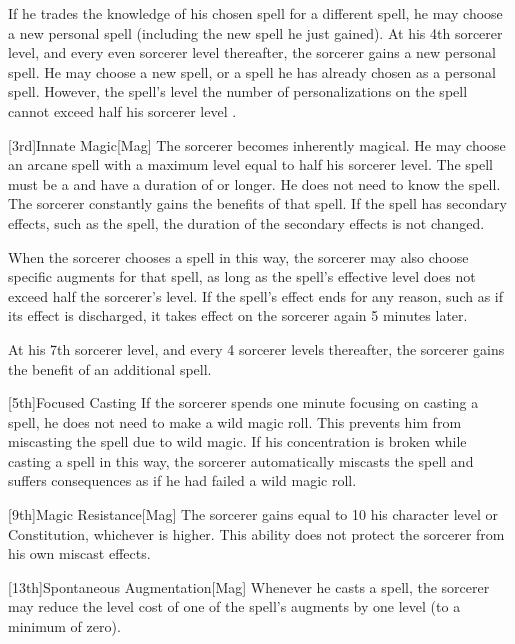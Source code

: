         If he trades the knowledge of his chosen spell for a different spell, he may choose a new personal spell (including the new spell he just gained).
        At his 4th sorcerer level, and every even sorcerer level thereafter, the sorcerer gains a new personal spell.
        He may choose a new spell, or a spell he has already chosen as a personal spell.
        However, the spell's level \add the number of personalizations on the spell cannot exceed half his sorcerer level .

        [3rd]{Innate Magic}[Mag]
        The sorcerer becomes inherently magical.
        He may choose an arcane spell with a maximum level equal to half his sorcerer level.
        The spell must be a  and have a duration of \durshort or longer.
        He does not need to know the spell.
        The sorcerer constantly gains the benefits of that spell.
        If the spell has secondary effects, such as the  spell, the duration of the secondary effects is not changed.

        When the sorcerer chooses a spell in this way, the sorcerer may also choose specific augments for that spell, as long as the spell's effective level does not exceed half the sorcerer's level.
        If the spell's effect ends for any reason, such as if its effect is discharged, it takes effect on the sorcerer again 5 minutes later.

        At his 7th sorcerer level, and every 4 sorcerer levels thereafter, the sorcerer gains the benefit of an additional spell.

        [5th]{Focused Casting}
        If the sorcerer spends one minute focusing on casting a spell, he does not need to make a wild magic roll.
        This prevents him from miscasting the spell due to wild magic.
        If his concentration is broken while casting a spell in this way, the sorcerer automatically miscasts the spell and suffers consequences as if he had failed a wild magic roll.

        [9th]{Magic Resistance}[Mag]
        The sorcerer gains  equal to 10 \add his character level or Constitution, whichever is higher.
        This ability does not protect the sorcerer from his own miscast effects.

        [13th]{Spontaneous Augmentation}[Mag]
        Whenever he casts a spell, the sorcerer may reduce the level cost of one of the spell's augments by one level (to a minimum of zero).

